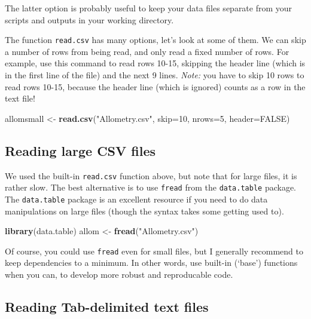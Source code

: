 \documentclass[]{book}
\newenvironment{Shaded}{\begin{snugshade}}{\end{snugshade}}
\newcommand{\DataTypeTok}[1]{\textcolor[rgb]{0.13,0.29,0.53}{#1}}
\newcommand{\DecValTok}[1]{\textcolor[rgb]{0.00,0.00,0.81}{#1}}
\newcommand{\KeywordTok}[1]{\textcolor[rgb]{0.13,0.29,0.53}{\textbf{#1}}}
\newcommand{\NormalTok}[1]{#1}
\newcommand{\OtherTok}[1]{\textcolor[rgb]{0.56,0.35,0.01}{#1}}
\newcommand{\StringTok}[1]{\textcolor[rgb]{0.31,0.60,0.02}{#1}}
\begin{document}
The latter option is probably useful to keep your data files separate from your scripts and outputs in your working directory.

The function \texttt{read.csv} has many options, let's look at some of them. We can skip a number of rows from being read, and only read a fixed number of rows. For example, use this command to read rows 10-15, skipping the header line (which is in the first line of the file) and the next 9 lines. \emph{Note:} you have to skip 10 rows to read rows 10-15, because the header line (which is ignored) counts as a row in the text file!

\begin{Shaded}
\begin{Highlighting}[]
\NormalTok{allomsmall <-}\StringTok{ }\KeywordTok{read.csv}\NormalTok{(}\StringTok{"Allometry.csv"}\NormalTok{, }\DataTypeTok{skip=}\DecValTok{10}\NormalTok{, }\DataTypeTok{nrows=}\DecValTok{5}\NormalTok{, }\DataTypeTok{header=}\OtherTok{FALSE}\NormalTok{)}
\end{Highlighting}
\end{Shaded}

\hypertarget{reading-large-csv-files}{%
\subsection{Reading large CSV files}\label{reading-large-csv-files}}

We used the built-in \texttt{read.csv} function above, but note that for large files, it is rather slow. The best alternative is to use \texttt{fread} from the \texttt{data.table} package. The \texttt{data.table} package is an excellent resource if you need to do data manipulations on large files (though the syntax takes some getting used to).

\begin{Shaded}
\begin{Highlighting}[]
\KeywordTok{library}\NormalTok{(data.table)}
\NormalTok{allom <-}\StringTok{ }\KeywordTok{fread}\NormalTok{(}\StringTok{"Allometry.csv"}\NormalTok{)}
\end{Highlighting}
\end{Shaded}

Of course, you could use \texttt{fread} even for small files, but I generally recommend to keep dependencies to a minimum. In other words, use built-in (`base') functions when you can, to develop more robust and reproducable code.

\hypertarget{tabdelimtext}{%
\subsection{Reading Tab-delimited text files}\label{tabdelimtext}}
\end{document}
